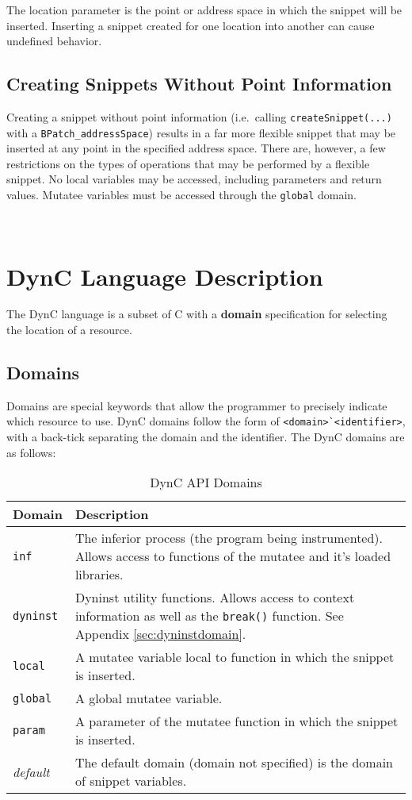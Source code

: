 \documentclass{article}
\begin{document}
The location parameter is the point or address space in which the snippet will be inserted. Inserting a snippet created for one location into another can cause undefined behavior.

\subsection{Creating Snippets Without Point Information}
\label{sec:nopoint}
Creating a snippet without point information (i.e.\ calling \verb!createSnippet(...)! with a \verb!BPatch_addressSpace!) results in a far more flexible snippet that may be inserted at any point in the specified address space. There are, however, a few restrictions on the types of operations that may be performed by a flexible snippet. No local variables may be accessed, including parameters and return values. Mutatee variables must be accessed through the \verb!global! domain.

\\
\section{DynC Language Description}
The DynC language is a subset of C with a \textbf{domain} specification for selecting the location of a resource.
\subsection{Domains}
Domains are special keywords that allow the programmer to precisely indicate which resource to use. 
DynC domains follow the form of \verb!<domain>`<identifier>!, with a back-tick separating the domain and the identifier. The DynC domains are as follows:

\begin{table}[!th]
\begin{tabular}{ | l | p{12cm} |}
\hline
Domain & Description\\
\hline
\verb!inf! & The inferior process (the program being instrumented). Allows access to functions of the mutatee and it's loaded libraries.\\
\hline
\verb!dyninst! & Dyninst utility functions. Allows access to context information as well as the \verb!break()! function. See Appendix \ref{sec:dyninstdomain}.\\
\hline
\verb!local! & A mutatee variable local to function in which the snippet is inserted. \\
\hline
\verb!global! & A global mutatee variable. \\
\hline
\verb!param! & A parameter of the mutatee function in which the snippet is inserted. \\
\hline
\textit{default} & The default domain (domain not specified) is the domain of snippet variables. \\
\hline

\end{tabular}
\caption{DynC API Domains}
\end{table}
\end{document}
